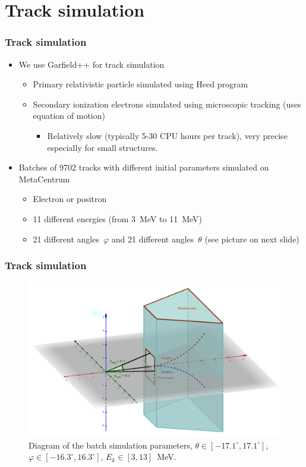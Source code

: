 \documentclass{beamer}
\begin{document}
	\section{Track simulation}
	\begin{frame}
		\frametitle{Track simulation}
		\begin{itemize}
			\item We use Garfield++ for track simulation
			\begin{itemize}
				\item Primary relativistic particle simulated using Heed program~\cite{heed}
				\item Secondary ionization electrons simulated using microscopic tracking (uses equation of motion)
				\begin{itemize}\item Relatively slow (typically 5-30 CPU hours per track), very precise especially for small structures.  \end{itemize}
			\end{itemize}
			\item Batches of 9702 tracks with different initial parameters simulated on MetaCentrum
			\begin{itemize}
				\item Electron or positron
				\item 11 different energies (from 3~MeV to 11~MeV)
				\item 21 different angles~$\varphi$ and 21 different angles~$\theta$ (see picture on next slide)
			\end{itemize}
		\end{itemize}
	\end{frame}
	
	\begin{frame}
		\frametitle{Track simulation}
		\begin{figure}
			\centering
			\includegraphics[width = 0.9 \linewidth]{../images/tpc_micro_simulation.png}
			\caption{Diagram of the batch simulation parameters, $\theta \in [-17.1^\circ,17.1^\circ]$, $\varphi \in [-16.3^\circ,16.3^\circ]$, $ E_k \in [3,13] $~MeV.}
		\end{figure}
	\end{frame}
	
\end{document}
